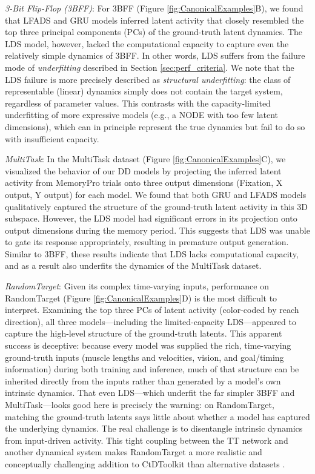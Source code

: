 \documentclass{article}
\begin{document}
\textit{3-Bit Flip-Flop (3BFF)}:
For 3BFF (Figure \ref{fig:CanonicalExamples}B), we found that LFADS and GRU models inferred latent activity that closely resembled the top three principal components (PCs) of the ground-truth latent dynamics. The LDS model, however, lacked the computational capacity to capture even the relatively simple dynamics of 3BFF. In other words, LDS suffers from the failure mode of \textit{underfitting} described in Section \ref{sec:perf_criteria}. We note that the LDS failure is more precisely described as \textit{structural underfitting}: the class of representable (linear) dynamics simply does not contain the target system, regardless of parameter values. This contrasts with the capacity-limited underfitting of more expressive models (e.g., a NODE with too few latent dimensions), which can in principle represent the true dynamics but fail to do so with insufficient capacity.

\textit{MultiTask}:
In the MultiTask dataset (Figure \ref{fig:CanonicalExamples}C), we visualized the behavior of our DD models by projecting the inferred latent activity from MemoryPro trials onto three output dimensions (Fixation, X output, Y output) for each model. We found that both GRU and LFADS models qualitatively captured the structure of the ground-truth latent activity in this 3D subspace. However, the LDS model had significant errors in its projection onto output dimensions during the memory period. This suggests that LDS was unable to gate its response appropriately, resulting in premature output generation. Similar to 3BFF, these results indicate that LDS lacks computational capacity, and as a result also underfits the dynamics of the MultiTask dataset.

\textit{RandomTarget}:
Given its complex time-varying inputs, performance on RandomTarget (Figure \ref{fig:CanonicalExamples}D) is the most difficult to interpret. Examining the top three PCs of latent activity (color-coded by reach direction), all three models—including the limited-capacity LDS—appeared to capture the high-level structure of the ground-truth latents. This apparent success is deceptive: because every model was supplied the rich, time-varying ground-truth inputs (muscle lengths and velocities, vision, and goal/timing information) during both training and inference, much of that structure can be inherited directly from the inputs rather than generated by a model's own intrinsic dynamics. That even LDS—which underfit the far simpler 3BFF and MultiTask—looks good here is precisely the warning: on RandomTarget, matching the ground-truth latents says little about whether a model has captured the underlying dynamics. The real challenge is to disentangle intrinsic dynamics from input-driven activity. This tight coupling between the TT network and another dynamical system makes RandomTarget a more realistic and conceptually challenging addition to CtDToolkit than alternative datasets \cite{kalidindi2021rotational}.
\end{document}

